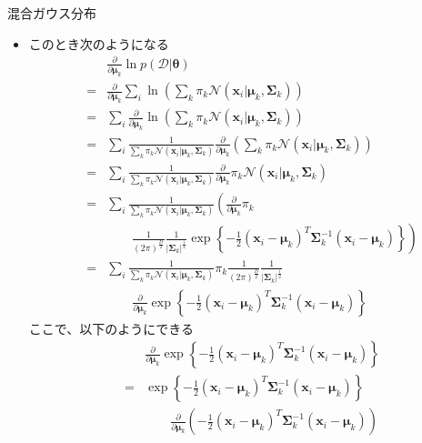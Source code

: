 \documentclass[dvipdfmx,notheorems,t]{beamer}
\begin{document}
\begin{frame}{混合ガウス分布}
\begin{itemize}
\begin{itemize}
		\item このとき次のようになる
		\begin{eqnarray}
			&& \frac{\partial}{\partial \bm{\mu}_k} \ln p(\mathcal{D} | \bm{\theta}) \nonumber \\
			&=& \frac{\partial}{\partial \bm{\mu}_k} \sum_i \ln \left( \sum_k \pi_k \mathcal{N}(\bm{x}_i | \bm{\mu}_k, \bm{\Sigma}_k) \right) \nonumber \\
			&=& \sum_i \frac{\partial}{\partial \bm{\mu}_k} \ln \left( \sum_k \pi_k \mathcal{N}(\bm{x}_i | \bm{\mu}_k, \bm{\Sigma}_k) \right) \nonumber \\
			&=& \sum_i \frac{1}{\sum_k \pi_k \mathcal{N}(\bm{x}_i | \bm{\mu}_k, \bm{\Sigma}_k)} \frac{\partial}{\partial \bm{\mu}_k} \left( \sum_k \pi_k \mathcal{N}(\bm{x}_i | \bm{\mu}_k, \bm{\Sigma}_k) \right) \nonumber \\
			&=& \sum_i \frac{1}{\sum_k \pi_k \mathcal{N}(\bm{x}_i | \bm{\mu}_k, \bm{\Sigma}_k)} \frac{\partial}{\partial \bm{\mu}_k} \pi_k \mathcal{N}(\bm{x}_i | \bm{\mu}_k, \bm{\Sigma}_k) \nonumber \\
			&=& \sum_i \frac{1}{\sum_k \pi_k \mathcal{N}(\bm{x}_i | \bm{\mu}_k, \bm{\Sigma}_k)} \left( \frac{\partial}{\partial \bm{\mu}_k} \pi_k \right. \nonumber \\
			&& \qquad \left. \frac{1}{(2\pi)^\frac{D}{2}} \frac{1}{|\bm{\Sigma}_k|^\frac{1}{2}} \exp \left\{ -\frac{1}{2} (\bm{x}_i - \bm{\mu}_k)^T \bm{\Sigma}_k^{-1} (\bm{x}_i - \bm{\mu}_k) \right\} \right) \nonumber \\
			&=& \sum_i \frac{1}{\sum_k \pi_k \mathcal{N}(\bm{x}_i | \bm{\mu}_k, \bm{\Sigma}_k)} \pi_k \frac{1}{(2\pi)^\frac{D}{2}} \frac{1}{|\bm{\Sigma}_k|^\frac{1}{2}} \nonumber \\
			&& \qquad \frac{\partial}{\partial \bm{\mu}_k} \exp \left\{ -\frac{1}{2} (\bm{x}_i - \bm{\mu}_k)^T \bm{\Sigma}_k^{-1} (\bm{x}_i - \bm{\mu}_k) \right\}
		\end{eqnarray}
		ここで、以下のようにできる
		\begin{eqnarray}
			&& \frac{\partial}{\partial \bm{\mu}_k} \exp \left\{ -\frac{1}{2} (\bm{x}_i - \bm{\mu}_k)^T \bm{\Sigma}_k^{-1} (\bm{x}_i - \bm{\mu}_k) \right\} \nonumber \\
			&=& \exp \left\{ -\frac{1}{2} (\bm{x}_i - \bm{\mu}_k)^T \bm{\Sigma}_k^{-1} (\bm{x}_i - \bm{\mu}_k) \right\} \nonumber \\
			&& \qquad \frac{\partial}{\partial \bm{\mu}_k} \left( -\frac{1}{2} (\bm{x}_i - \bm{\mu}_k)^T \bm{\Sigma}_k^{-1} (\bm{x}_i - \bm{\mu}_k) \right)
		\end{eqnarray}

\end{itemize}
\end{itemize}
\end{frame}
\end{document}
